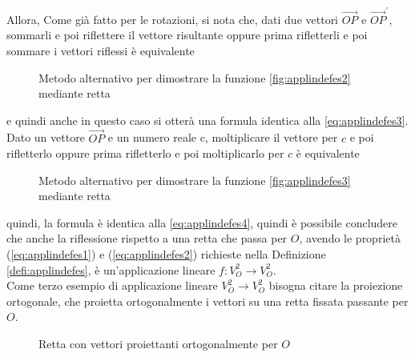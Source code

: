 \begin{es}
  Allora, Come già fatto per le rotazioni, si nota che, dati due vettori
  $\vec{OP}$ e $\vec{OP}^\prime$, sommarli e poi riflettere il vettore
  risultante oppure prima rifletterli e poi sommare i vettori riflessi è
  equivalente
  \clearpage
  \begin{figure}[ht!]
    \centering
    \resizebox{7cm}{!}{}
    \caption{Metodo alternativo per dimostrare la funzione
      \ref{fig:applindefes2} mediante retta}
    \label{fig:applindefes5}
  \end{figure}
  e quindi anche in questo caso si otterà una formula identica alla
  \ref{eq:applindefes3}. Dato un vettore $\vec{OP}$ e un numero reale c,
  moltiplicare il vettore per $c$ e poi rifletterlo oppure prima
  rifletterlo e poi moltiplicarlo per $c$ è equivalente
  \begin{figure}[ht!]
    \centering
    \resizebox{7cm}{!}{}
    \caption{Metodo alternativo per dimostrare la funzione \ref{fig:applindefes3} mediante retta}
    \label{fig:applindefes6}
  \end{figure}

  quindi, la formula è identica alla \ref{eq:applindefes4}, quindi
  è possibile concludere che anche la riflessione rispetto a una retta che
  passa per $O$, avendo le proprietà (\ref{eq:applindefes1}) e
  (\ref{eq:applindefes2}) richieste nella Definizione
  \ref{defi:applindefes}, è un'applicazione lineare $f:V_O^2\to V_O^2$.\\
  Come terzo esempio di applicazione lineare $V_O^2\to V_O^2$ bisogna
  citare la proiezione ortogonale, che proietta ortogonalmente i vettori
  su una retta fissata passante per $O$.
  \begin{figure}[ht!]
    \centering
    \resizebox{8cm}{!}{}
    \caption{Retta con vettori proiettanti ortogonalmente per $O$}
    \label{fig:applindefes7}
  \end{figure}


\end{es}
